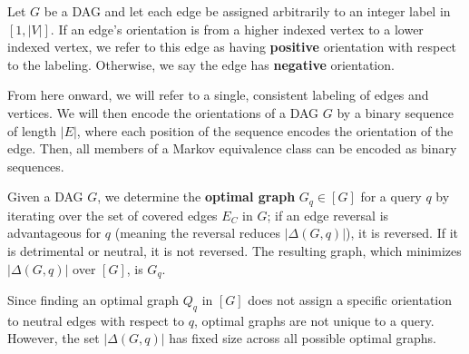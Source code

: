\begin{definition}
Let $G$ be a DAG and let each edge be assigned arbitrarily to an integer label in $[1,|V|]$. If an edge's orientation is from a higher indexed vertex to a lower indexed vertex, we refer to this edge as having \textbf{positive} orientation with respect to the labeling. Otherwise, we say the edge has \textbf{negative} orientation. 
\end{definition}
\null \quad \quad From here onward, we will refer to a single, consistent labeling of edges and vertices. We will then encode the orientations of a DAG $G$ by a binary sequence of length $|E|$, where each position of the sequence encodes the orientation of the edge. Then, all members of a Markov equivalence class can be encoded as binary sequences. \newline

\begin{lemma} Given a DAG $G$, we determine the \textbf{optimal graph} $G_{q} \in [G]$ for a query $q$ by iterating over the set of covered edges $E_{C}$ in $G$; if an edge reversal is advantageous for $q$ (meaning the reversal reduces $|\Delta(G,q)|$), it is reversed. If it is detrimental or neutral, it is not reversed. The resulting graph, which minimizes $|\Delta(G,q)|$ over $[G]$, is $G_{q}$.
\end{lemma}

\begin{remark}Since finding an optimal graph $Q_{q}$ in $[G]$ does not assign a specific orientation to neutral edges with respect to $q$, optimal graphs are not unique to a query. However, the set $|\Delta(G,q)|$ has fixed size across all possible optimal graphs. 
\end{remark}

